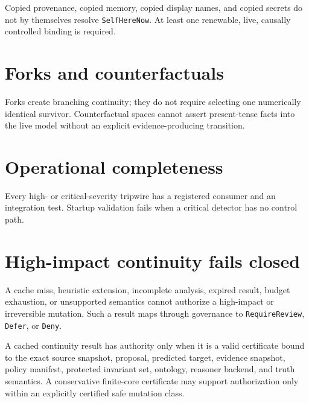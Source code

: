 \documentclass[11pt,oneside]{report}
\newcommand{\SelfHereNow}{\texttt{SelfHereNow}}
\begin{document}
\begin{invariantbox}
Copied provenance, copied memory, copied display names, and copied secrets do not by themselves resolve \SelfHereNow{}. At least one renewable, live, causally controlled binding is required.
\end{invariantbox}

\section{Forks and counterfactuals}

\begin{invariantbox}
Forks create branching continuity; they do not require selecting one numerically identical survivor. Counterfactual spaces cannot assert present-tense facts into the live model without an explicit evidence-producing transition.
\end{invariantbox}

\section{Operational completeness}

\begin{invariantbox}
Every high- or critical-severity tripwire has a registered consumer and an integration test. Startup validation fails when a critical detector has no control path.
\end{invariantbox}

\section{High-impact continuity fails closed}

\begin{invariantbox}
A cache miss, heuristic extension, incomplete analysis, expired result, budget exhaustion, or unsupported semantics cannot authorize a high-impact or irreversible mutation. Such a result maps through governance to \texttt{RequireReview}, \texttt{Defer}, or \texttt{Deny}.
\end{invariantbox}

A cached continuity result has authority only when it is a valid certificate bound to the exact source snapshot, proposal, predicted target, evidence snapshot, policy manifest, protected invariant set, ontology, reasoner backend, and truth semantics. A conservative finite-core certificate may support authorization only within an explicitly certified safe mutation class.
\end{document}
